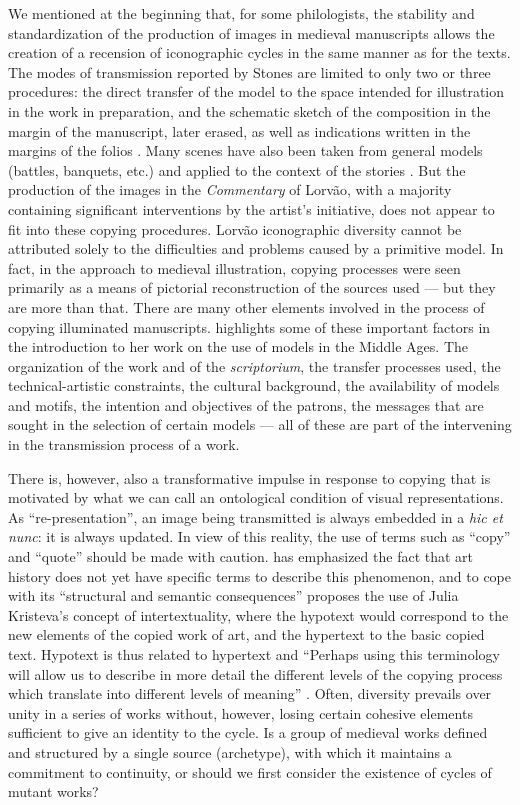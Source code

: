 \documentclass{article}
\begin{document}
We mentioned at the beginning that, for some philologists, the stability
and standardization of the production of images in medieval manuscripts
allows the creation of a recension of iconographic cycles in the same
manner as for the texts. The modes of transmission reported by Stones
are limited to only two or three procedures: the direct transfer of the
model to the space intended for illustration in the work in preparation,
and the schematic sketch of the composition in the margin of the
manuscript, later erased, as well as indications written in the margins
of the folios \citep[96]{stones_secular_1976}. Many scenes have also been taken from
general models (battles, banquets, etc.) and applied to the context of
the stories \citep{scheller_exemplum_1995}. But the production of the images in the
\emph{Commentary} of Lorvão, with a majority containing significant
interventions by the artist's initiative, does not appear to fit into
these copying procedures. Lorvão iconographic diversity cannot be
attributed solely to the difficulties and problems caused by a primitive
model. In fact, in the approach to medieval illustration, copying
processes were seen primarily as a means of pictorial reconstruction of
the sources used –– but they are more than that. There are many other
elements involved in the process of copying illuminated manuscripts. \citet{muller_use_2014} highlights some of these important factors in the
introduction to her work on the use of models in the Middle Ages. The
organization of the work and of the \emph{scriptorium}, the transfer
processes used, the technical-artistic constraints, the cultural
background, the availability of models and motifs, the intention and
objectives of the patrons, the messages that are sought in the selection
of certain models –– all of these are part of the intervening in the
transmission process of a work.

There is, however, also a transformative impulse in response to copying
that is motivated by what we can call an ontological condition of visual
representations. As ``re-presentation'', an image being transmitted is
always embedded in a \emph{hic et nunc}: it is always updated. In view
of this reality, the use of terms such as ``copy'' and ``quote'' should
be made with caution. \citet{muller_use_2014} has emphasized the fact that art
history does not yet have specific terms to describe this phenomenon,
and to cope with its ``structural and semantic consequences'' proposes
the use of Julia Kristeva's concept of intertextuality, where the
hypotext would correspond to the new elements of the copied work of art,
and the hypertext to the basic copied text. Hypotext is thus related to
hypertext and ``Perhaps using this terminology will allow us to describe
in more detail the different levels of the copying process which
translate into different levels of meaning'' \citep[xxvi]{muller_use_2014}. Often,
diversity prevails over unity in a series of works without, however,
losing certain cohesive elements sufficient to give an identity to the
cycle. Is a group of medieval works defined and structured by a single
source (archetype), with which it maintains a commitment to continuity,
or should we first consider the existence of cycles of mutant works?
\end{document}
